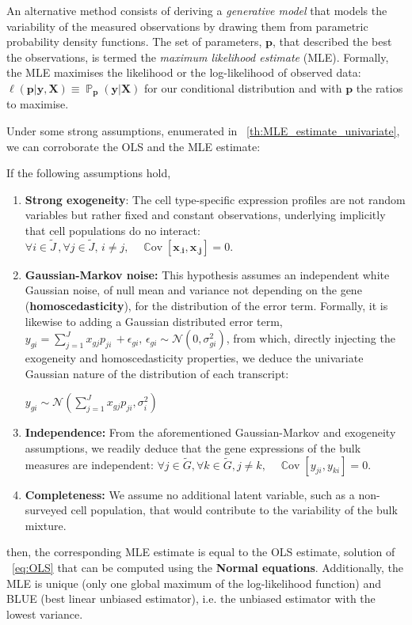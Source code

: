 \documentclass[long, final]{jobim}
\DeclareMathOperator*{\prob}{\mathbb{P}}
\DeclareMathOperator*{\cov}{\mathbb{C}\text{ov}}
\newcommand \CC [1]{\cov\left[{#1}\right]}
\begin{document}
An alternative method consists of deriving a \textit{generative model} that models the variability of the measured observations by drawing them from parametric probability density functions. The set of parameters, $\boldsymbol{p}$, that described the best the observations, is termed the \textit{maximum likelihood estimate} (MLE). Formally, the MLE maximises the likelihood or the log-likelihood of observed data: $\ell(\boldsymbol{p}|\boldsymbol{y}, \boldsymbol{X}) \equiv \prob_{\boldsymbol{p}}(\boldsymbol{y}|\boldsymbol{X})$ for our conditional distribution and with $\boldsymbol{p}$ the ratios to maximise.

Under some strong assumptions, enumerated in \theoremname~\ref{th:MLE_estimate_univariate}, we can corroborate the OLS and the MLE estimate:

\begin{theorem}
If the following assumptions hold,
\begin{enumerate}
    \item \textbf{Strong exogeneity}: The cell type-specific expression profiles are not random variables but rather fixed and constant observations, underlying implicitly that cell populations do no interact:
  \(\forall i \in \widetilde{J} \, ,  \forall j \in \widetilde{J}, \, i \neq j, \quad \CC{\boldsymbol{x_{.i}}, \boldsymbol{x_{.j}}}=0\).
  \item \textbf{Gaussian-Markov noise:} This hypothesis assumes an independent white Gaussian noise, of null mean and variance not depending on the gene (\textbf{homoscedasticity}), for the distribution of the error term. Formally, it is likewise to adding a Gaussian distributed error term, $y_{gi} = \sum_{j=1}^J  x_{gj}p_{ji} \, + \epsilon_{gi}, \, \epsilon_{gi} \sim \mathcal{N} \left(0, \sigma_{gi}^2\right)$, from which, directly injecting the exogeneity and homoscedasticity properties, we deduce the univariate Gaussian nature of the distribution of each transcript:

  $y_{gi} \sim \mathcal{N} \left(\sum_{j=1}^J  x_{gj}p_{ji}, \sigma_{i}^2 \right)$
  \item \textbf{Independence:} From the aforementioned Gaussian-Markov and exogeneity assumptions, we readily deduce that the gene expressions of the bulk measures are independent: \(\forall j \in \widetilde{G}, \forall k \in \widetilde{G}, j \neq k, \quad  \CC{y_{ji}, y_{ki}}=0\).
  \item \textbf{Completeness:} We assume no additional latent variable, such as a non-surveyed cell population, that would contribute to the variability of the bulk mixture.
\end{enumerate}
then, the corresponding MLE estimate is equal to the OLS estimate, solution of \equationname ~\ref{eq:OLS} that can be computed using the \textbf{Normal equations}. Additionally, the MLE is unique (only one global maximum of the log-likelihood function) and BLUE (best linear unbiased estimator), i.e. the unbiased estimator with the lowest variance.
\label{th:MLE_estimate_univariate}
\end{theorem}
\end{document}
